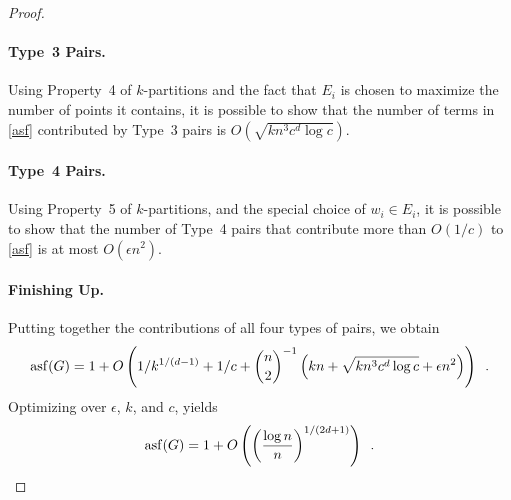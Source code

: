 \documentclass{patmorin}
\DeclareMathOperator{\asf}{asf}
\begin{document}
\begin{proof}
  \paragraph{Type~3 Pairs.} Using Property~4 of $k$-partitions and the
  fact that $E_i$ is chosen to maximize the number of points it contains,
  it is possible to show that the number of terms in \eqref{asf} contributed
  by Type~3 pairs is $O\left(\sqrt{kn^3c^d\log c}\right)$.

  \paragraph{Type~4 Pairs.}  Using Property~5 of $k$-partitions, and the
  special choice of $w_i\in E_i$, it is possible to show that the number
  of Type~4 pairs that contribute more than $O(1/c)$ to \eqref{asf}
  is at most $O(\epsilon n^2)$.

  \paragraph{Finishing Up.}
  Putting together the contributions of all four types of pairs, we obtain
  \begin{equation}\eqlabel{master-asf}
     \asf(G) = 1 + O\left(1/k^{1/(d-1)} + 1/c 
       + \binom{n}{2}^{-1}\left(kn+\sqrt{kn^{3}c^{d}\log c}
             +\epsilon n^2\right)\right) \enspace .
  \end{equation}
  Optimizing over $\epsilon$, $k$, and $c$, yields
  \[
     \asf(G) = 1+ O\left(\left(\frac{\log n}{n}\right)^{1/(2d+1)}\right) \enspace . \qedhere
  \]
\end{proof}

%
\end{document}
